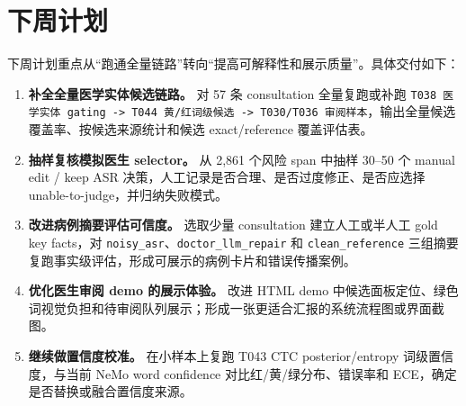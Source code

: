 \documentclass[UTF8,a4paper,12pt]{ctexart}
\newcommand{\code}[1]{\texttt{#1}}
\begin{document}
\section{下周计划}

下周计划重点从“跑通全量链路”转向“提高可解释性和展示质量”。具体交付如下：

\begin{enumerate}
  \item \textbf{补全全量医学实体候选链路。}
  对 57 条 consultation 全量复跑或补跑 \code{T038 医学实体 gating -> T044 黄/红词级候选 -> T030/T036 审阅样本}，输出全量候选覆盖率、按候选来源统计和候选 exact/reference 覆盖评估表。

  \item \textbf{抽样复核模拟医生 selector。}
  从 2,861 个风险 span 中抽样 30--50 个 manual edit / keep ASR 决策，人工记录是否合理、是否过度修正、是否应选择 unable-to-judge，并归纳失败模式。

  \item \textbf{改进病例摘要评估可信度。}
  选取少量 consultation 建立人工或半人工 gold key facts，对 \code{noisy\_asr}、\code{doctor\_llm\_repair} 和 \code{clean\_reference} 三组摘要复跑事实级评估，形成可展示的病例卡片和错误传播案例。

  \item \textbf{优化医生审阅 demo 的展示体验。}
  改进 HTML demo 中候选面板定位、绿色词视觉负担和待审阅队列展示；形成一张更适合汇报的系统流程图或界面截图。

  \item \textbf{继续做置信度校准。}
  在小样本上复跑 T043 CTC posterior/entropy 词级置信度，与当前 NeMo word confidence 对比红/黄/绿分布、错误率和 ECE，确定是否替换或融合置信度来源。
\end{enumerate}
\end{document}
